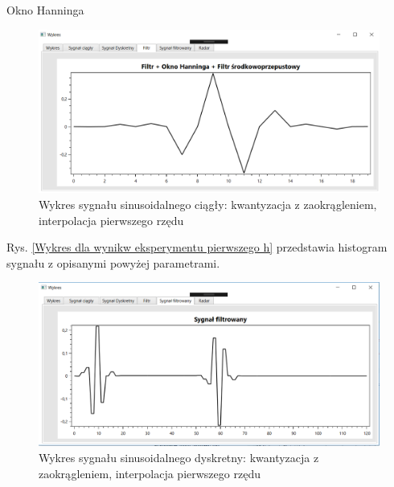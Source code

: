 \documentclass[12pt]{article}
\begin{document}
\newpage
Okno Hanninga
\begin{figure}[h!]
 \centering
 \includegraphics[width=12.3cm]{prostFSOHn.PNG}
 \vspace{-0.3cm}
 \caption{Wykres sygnału sinusoidalnego ciągły: kwantyzacja z zaokrągleniem, interpolacja pierwszego rzędu}
 \label{Wykres dla wyników eksperymentu drugiego}
\end{figure}
\newpage
Rys. \ref{Wykres dla wynikw eksperymentu pierwszego h} przedstawia histogram sygnału z opisanymi powyżej parametrami. 
\begin{figure}[h!]
 \centering
 \includegraphics[width=12.3cm]{prostSFSHn.PNG}
 \vspace{-0.3cm}
 \caption{Wykres sygnału sinusoidalnego dyskretny: kwantyzacja z zaokrągleniem, interpolacja pierwszego rzędu}
 \label{Histogram dla wyników eksperymentu drugiego}
\end{figure}
\end{document}

